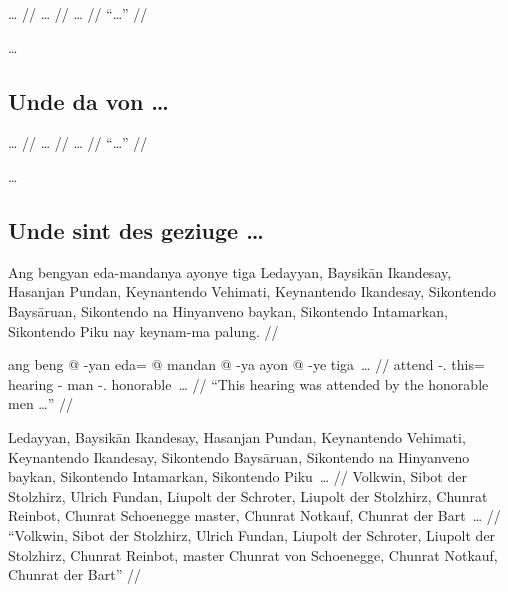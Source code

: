 \documentclass[12pt,paper=a4]{scrartcl}
\begin{document}

\ex \begingl
	\glpreamble … //
	\gla … //
	\glb … //
	\glft \enquote{…} //
\endgl \xe

…

\subsection*{Unde da von …}


\ex \begingl
	\glpreamble … //
	\gla … //
	\glb … //
	\glft \enquote{…} //
\endgl \xe

…

\subsection*{Unde sint des geziuge …}


\pex 
	\glpreamble Ang bengyan eda-mandanya ayonye tiga Ledayyan, Baysikān 
		Ikandesay, Hasanjan Pundan, Keynantendo Vehimati, Keynantendo 
		Ikandesay, Sikontendo Baysāruan, Sikontendo na Hinyanveno 
		baykan, Sikontendo Intamarkan, Sikontendo Piku nay keynam-ma 
		palung. //
	
	\a \begingl
		\gla ang beng @ -yan eda= @ mandan @ -ya ayon @ -ye tiga~… //
		\glb \AgtT{} attend -\Tpl{}.\M{} this= hearing -\Loc{} man 
			-\Pl{}.\Top{} honorable~… //
		\glft \enquote{This hearing was attended by the honorable men 
			…} //
	\endgl
	
	\a \begingl
		\gla Ledayyan, Baysikān Ikandesay, Hasanjan Pundan, Keynantendo 
			Vehimati, Keynantendo Ikandesay, Sikontendo Baysāruan, 
			Sikontendo na Hinyanveno baykan, Sikontendo Intamarkan, 
			Sikontendo Piku~… //
		\glb Volkwin, Sibot {der Stolzhirz}, Ulrich Fundan, Liupolt 
			{der Schroter}, Liupolt {der Stolzhirz}, Chunrat 
			Reinbot, Chunrat \Gen{} Schoenegge master, Chunrat 
			Notkauf, Chunrat {der Bart}~… //
		\glft \enquote{Volkwin, Sibot der Stolzhirz, Ulrich Fundan, 
			Liupolt der Schroter, Liupolt der Stolzhirz, Chunrat 
			Reinbot, master Chunrat von Schoenegge, Chunrat Notkauf, 
			Chunrat der Bart} //
	\endgl
	
\end{document}

